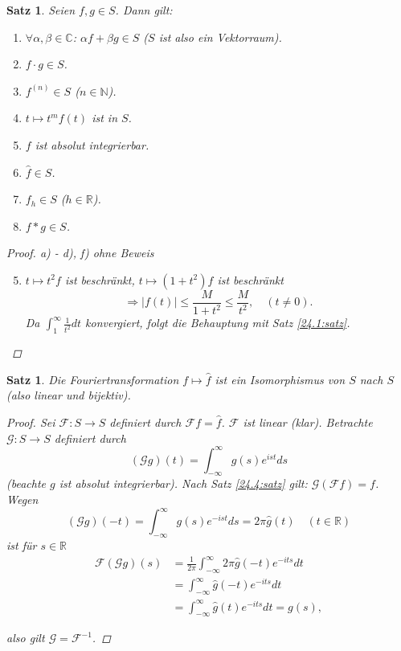 \documentclass[12pt]{extreport} %
\newcommand{\C}{\mathbb{C}}
\newcommand{\N}{\mathbb{N}}
\newcommand{\R}{\mathbb{R}}
\theoremstyle{named}
\theoremstyle{nnamed}
\theoremstyle{itshape}
\newtheorem{satz}[unnamedtheorem]{Satz}
\theoremstyle{normal}
\begin{document}
\begin{satz} \label{24.10:satz}
	Seien $f, g \in S$. Dann gilt:
	\begin{enumerate}
		\item $\forall \alpha, \beta \in \C$: $\alpha f + \beta g \in S$ ($S$ ist also ein Vektorraum).
		\item $f \cdot g \in S$.
		\item $f^{(n)} \in S$ ($n \in \N$).
		\item $t \mapsto t^{m} f(t)$ ist in $S$.
		\item $f$ ist absolut integrierbar.
		\item $\hat{f} \in S$.
		\item $f_{h} \in S$ ($h \in \R$).
		\item $f \ast g \in S$.
	\end{enumerate}
	
	\begin{proof}
		a) - d), f) ohne Beweis
		\begin{enumerate} \setcounter{enumi}{4}
			\item $t \mapsto t^{2} f$ ist beschränkt, $t \mapsto \left(1 + t^{2}\right)f$ ist beschränkt 
				$$ \Rightarrow \left| f(t) \right| \leq \frac{M}{1 + t^{2}} \leq \frac{M}{t^{2}}, \quad (t \neq 0). $$
				Da $\int_{1}^{\infty} \frac{1}{t^{2}} dt$ konvergiert, folgt die Behauptung mit Satz \ref{24.1:satz}. %
		\end{enumerate}
	\end{proof}
\end{satz}


\begin{satz} \label{24.11:satz}
	Die Fouriertransformation $f \mapsto \hat{f}$ ist ein Isomorphismus von $S$ nach $S$ (also linear und bijektiv).
	
	\begin{proof}
		Sei $\mathcal{F} \colon S \rightarrow S$ definiert durch $\mathcal{F} f = \hat{f}$. $\mathcal{F}$ ist linear (klar). Betrachte $\mathcal{G} \colon S \rightarrow S$ definiert durch
			$$ \left( \mathcal{G} g \right)(t) = \int_{-\infty}^{\infty} g(s) e^{ist} ds $$
		(beachte $g$ ist absolut integrierbar). Nach Satz \ref{24.4:satz} gilt: $\mathcal{G} \left( \mathcal{F}f \right) = f$. Wegen
			$$ \left( \mathcal{G}g\right)(-t) = \int_{-\infty}^{\infty} g(s) e^{-ist} ds = 2\pi \hat{g}(t) \quad (t \in \R) $$
		ist für $s \in \R$
			\begin{align*}
				\mathcal{F} \left( \mathcal{G} g \right) (s) & = \frac{1}{2 \pi} \int_{-\infty}^{\infty} 2 \pi \hat{g}(-t) e^{-its} dt \\
					& = \int_{-\infty}^{\infty} \hat{g}(-t) e^{-its} dt \\
					& = \int_{-\infty}^{\infty} \hat{g}(t) e^{-its} dt = g(s), 
			\end{align*}
			
		also gilt $\mathcal{G} = \mathcal{F}^{-1}$.	
	\end{proof}
\end{satz}


\appendix 

\renewcommand{\indexname}{Stichwortverzeichnis}
\printindex
\end{document}
